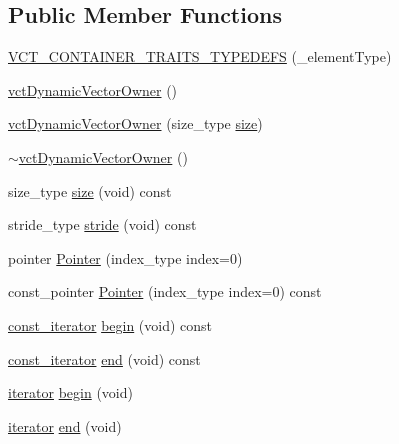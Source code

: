 \subsection*{Public Member Functions}
\begin{DoxyCompactItemize}
\item 
\hyperlink{classvct_dynamic_vector_owner_aad50327e7c7be01742646b1531bf9097}{V\+C\+T\+\_\+\+C\+O\+N\+T\+A\+I\+N\+E\+R\+\_\+\+T\+R\+A\+I\+T\+S\+\_\+\+T\+Y\+P\+E\+D\+E\+F\+S} (\+\_\+element\+Type)
\item 
\hyperlink{classvct_dynamic_vector_owner_aa31c2ead5f0f418224b594d74b88c015}{vct\+Dynamic\+Vector\+Owner} ()
\item 
\hyperlink{classvct_dynamic_vector_owner_a9c9cc10064a82cf050b0d8188dbb0f19}{vct\+Dynamic\+Vector\+Owner} (size\+\_\+type \hyperlink{classvct_dynamic_vector_owner_a6a2cc98b79ff181f755df05a8d45780a}{size})
\item 
\hyperlink{classvct_dynamic_vector_owner_a5905281268660dc7690b706d6505b9ef}{$\sim$vct\+Dynamic\+Vector\+Owner} ()
\item 
size\+\_\+type \hyperlink{classvct_dynamic_vector_owner_a6a2cc98b79ff181f755df05a8d45780a}{size} (void) const 
\item 
stride\+\_\+type \hyperlink{classvct_dynamic_vector_owner_ab97de545039cf02d9b4f4a7d251731af}{stride} (void) const 
\item 
pointer \hyperlink{classvct_dynamic_vector_owner_a8359c5db66a863647fca1531896311b7}{Pointer} (index\+\_\+type index=0)
\item 
const\+\_\+pointer \hyperlink{classvct_dynamic_vector_owner_a7490d50d02a9ddcdc7e4708dea981560}{Pointer} (index\+\_\+type index=0) const 
\item 
\hyperlink{classvct_dynamic_vector_owner_a607608d191422c1d82168ffecd37c853}{const\+\_\+iterator} \hyperlink{classvct_dynamic_vector_owner_a9e677b14c7878736b9255530e606c879}{begin} (void) const 
\item 
\hyperlink{classvct_dynamic_vector_owner_a607608d191422c1d82168ffecd37c853}{const\+\_\+iterator} \hyperlink{classvct_dynamic_vector_owner_af49debdda491963852103e4fc5bb3c5b}{end} (void) const 
\item 
\hyperlink{classvct_dynamic_vector_owner_a0ef55f887d1340204d64f21d4db08fad}{iterator} \hyperlink{classvct_dynamic_vector_owner_a16e3e221073c79a07ea58bfb402a9380}{begin} (void)
\item 
\hyperlink{classvct_dynamic_vector_owner_a0ef55f887d1340204d64f21d4db08fad}{iterator} \hyperlink{classvct_dynamic_vector_owner_a9912928e7dadb432f157932fccd914d1}{end} (void)

\end{DoxyCompactItemize}
